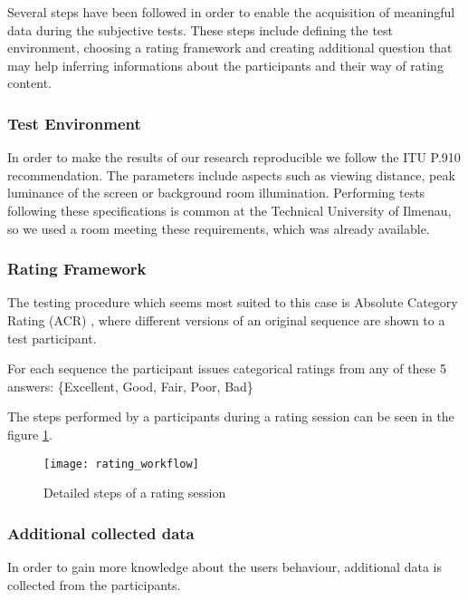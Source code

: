 Several steps have been followed in order to enable the acquisition of meaningful data during the subjective tests. These steps include defining the test environment, choosing a rating framework and creating additional question that may help inferring informations about the participants and their way of rating content.


\subsubsection{Test Environment}
In order to make the results of our research reproducible we follow the ITU P.910 \cite{rec1998p} recommendation. 
The parameters include aspects such as viewing distance, peak luminance of the screen or background room illumination.
Performing tests following these specifications is common at the Technical University of Ilmenau, so we used a room meeting these requirements, which was already available.


	
\subsubsection{Rating Framework}
The testing procedure which seems most suited to this case is Absolute Category Rating (ACR) \cite{rec1998p}, where different versions of an original sequence are shown to a test participant. 

For each sequence the participant issues categorical ratings from any of these 5 answers: \{Excellent, Good, Fair, Poor, Bad\}

The steps performed by a participants during a rating session can be seen in the figure \ref{fig:workflow:state_machine}.

\begin{figure}[htb!]
	\centering
	\texttt{[image: rating\_workflow]}
	\caption{Detailed steps of a rating session}
	\label{fig:workflow:state_machine}
\end{figure}


\subsubsection{Additional collected data}
In order to gain more knowledge about the users behaviour, additional data is collected from the participants.

